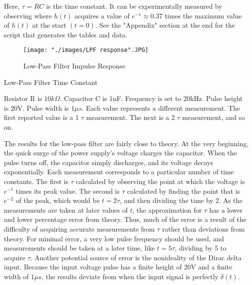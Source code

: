 Here, $\tau = RC$ is the time constant. It can be experimentally measured by observing where $h(t)$ acquires a value of $e^{-1} \approx 0.37$ times the maximum value of $h(t)$ at the start $(t = 0)$. See the "Appendix" section at the end for the script that generates the tables and data.


\FloatBarrier

\begin{figure}[h!]
\centering
\texttt{[image: "./images/LPF response".JPG]}
\caption{Low-Pass Filter Impulse Response}
\label{fig:lpf_response}
\end{figure}

\FloatBarrier

\begin{table}[h!]
\centering
\caption{Low-Pass Filter Time Constant}
\label{tab:lpf_tau}
\end{table}
{\footnotesize Resistor R is $10k\Omega$. Capacitor C is 1nF. Frequency is set to 20kHz. Pulse height is 20V. Pulse width is $1\mu s$. Each value represents a different measurement. The first reported value is a 1 $\tau$ measurement. The next is a 2 $\tau$ measurement, and so on.} \\
\FloatBarrier

The results for the low-pass filter are fairly close to theory. At the very beginning, the quick surge of the power supply's voltage charges the capacitor. When the pulse turns off, the capacitor simply discharges, and its voltage decays exponentially.
Each measurement corresponds to a particular number of time constants. The first is $\tau$ calculated by observing the point at which the voltage is $e^{-1}$ times its peak value. The second is $\tau$ calculated by finding the point that is $e^{-2}$ of the peak, which would be $t = 2\tau$, and then dividing the time by 2. As the measurements are taken at later values of $t$, the approximation for $\tau$ has a lower and lower percentage error from theory. Thus, much of the error is a result of the difficulty of acquiring accurate measurements from $\tau$ rather than deviations from theory. For minimal error, a very low pulse frequency should be used, and measurements should be taken at a later time, like $t=5\tau$, dividing by 5 to acquire $\tau$.
Another potential source of error is the nonideality of the Dirac delta input. Because the input voltage pulse has a finite height of 20V and a finite width of $1\mu s$, the results deviate from when the input signal is perfectly $\delta(t)$.

